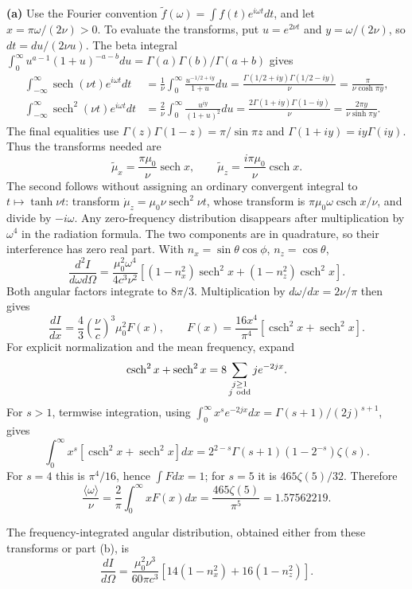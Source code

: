 \textbf{(a)} Use the Fourier convention $\widetilde f(\omega)=
\int f(t)e^{i\omega t}dt$, and let $x=\pi\omega/(2\nu)>0$.
To evaluate the transforms, put $u=e^{2\nu t}$ and
$y=\omega/(2\nu)$, so $dt=du/(2\nu u)$.
The beta integral $\int_0^\infty u^{a-1}(1+u)^{-a-b}du
=\Gamma(a)\Gamma(b)/\Gamma(a+b)$ gives
\begin{align*}
\int_{-\infty}^{\infty}\operatorname{sech}(\nu t)e^{i\omega t}dt
&=\frac1\nu\int_0^\infty\frac{u^{-1/2+iy}}{1+u}du
=\frac{\Gamma(1/2+iy)\Gamma(1/2-iy)}{\nu}
=\frac{\pi}{\nu\cosh\pi y},\\
\int_{-\infty}^{\infty}\operatorname{sech}^2(\nu t)e^{i\omega t}dt
&=\frac2\nu\int_0^\infty\frac{u^{iy}}{(1+u)^2}du
=\frac{2\Gamma(1+iy)\Gamma(1-iy)}{\nu}
=\frac{2\pi y}{\nu\sinh\pi y}.
\end{align*}
The final equalities use $\Gamma(z)\Gamma(1-z)=\pi/\sin\pi z$
and $\Gamma(1+iy)=iy\Gamma(iy)$.
Thus the transforms needed are
\[
\widetilde\mu_x=\frac{\pi\mu_0}{\nu}\operatorname{sech}x,\qquad
\widetilde\mu_z=\frac{i\pi\mu_0}{\nu}\operatorname{csch}x.
\]
The second follows without assigning an ordinary convergent integral to
$t\mapsto\tanh\nu t$: transform
$\dot\mu_z=\mu_0\nu\operatorname{sech}^2\nu t$, whose transform is
$\pi\mu_0\omega\operatorname{csch}x/\nu$, and divide by $-i\omega$.
Any zero-frequency distribution disappears after multiplication by
$\omega^4$ in the radiation formula.
The two components are in quadrature, so their interference has zero
real part. With $n_x=\sin\theta\cos\phi$, $n_z=\cos\theta$,
\[
\boxed{\frac{d^2I}{d\omega d\Omega}
=\frac{\mu_0^2\omega^4}{4c^3\nu^2}
[(1-n_x^2)\operatorname{sech}^2x+
(1-n_z^2)\operatorname{csch}^2x].}
\]
Both angular factors integrate to $8\pi/3$. Multiplication by
$d\omega/dx=2\nu/\pi$ then gives
\[
\frac{dI}{dx}=\frac43\left(\frac\nu c\right)^3\mu_0^2 F(x),\qquad
F(x)=\frac{16x^4}{\pi^4}
[\operatorname{csch}^2x+\operatorname{sech}^2x].
\]
For explicit normalization and the mean frequency, expand
\[
\operatorname{csch}^2x+\operatorname{sech}^2x
=8\sum_{\substack{j\ge1\\j\ {\rm odd}}}j e^{-2jx}.
\]
For $s>1$, termwise integration, using
$\int_0^\infty x^s e^{-2jx}dx=\Gamma(s+1)/(2j)^{s+1}$, gives
\[
\int_0^\infty x^s[\operatorname{csch}^2x+\operatorname{sech}^2x]dx
=2^{2-s}\Gamma(s+1)(1-2^{-s})\zeta(s).
\]
For $s=4$ this is $\pi^4/16$, hence $\int Fdx=1$; for $s=5$ it is
$465\zeta(5)/32$. Therefore
\[
\boxed{\frac{\langle\omega\rangle}{\nu}
=\frac2\pi\int_0^\infty xF(x)dx
=\frac{465\zeta(5)}{\pi^5}=1.57562219.}
\]
\begin{center}\end{center}
The frequency-integrated angular distribution, obtained either from
these transforms or part (b), is
\[
\boxed{\frac{dI}{d\Omega}=\frac{\mu_0^2\nu^3}{60\pi c^3}
[14(1-n_x^2)+16(1-n_z^2)].}
\]

